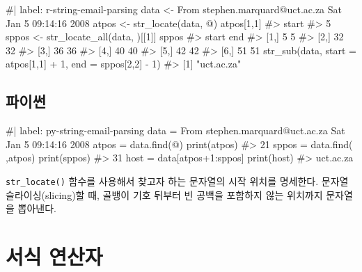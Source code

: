 \documentclass[
  letterpaper,
]{book}
\newenvironment{Shaded}{\begin{snugshade}}{\end{snugshade}}
\newcommand{\NormalTok}[1]{\textcolor[rgb]{0.00,0.23,0.31}{#1}}
\begin{document}
\begin{Shaded}
\begin{Highlighting}[]
\NormalTok{\#| label: r{-}string{-}email{-}parsing}
\NormalTok{data \textless{}{-} \textquotesingle{}From stephen.marquard@uct.ac.za Sat Jan 5 09:14:16 2008\textquotesingle{}}
\NormalTok{atpos \textless{}{-} str\_locate(data, \textquotesingle{}@\textquotesingle{})}
\NormalTok{atpos[1,1]}
\NormalTok{\#\textgreater{} start }
\NormalTok{\#\textgreater{}    5 }
\NormalTok{sppos \textless{}{-} str\_locate\_all(data, \textquotesingle{} \textquotesingle{})[[1]]}
\NormalTok{sppos}
\NormalTok{\#\textgreater{}      start end}
\NormalTok{\#\textgreater{} [1,]     5   5}
\NormalTok{\#\textgreater{} [2,]    32  32}
\NormalTok{\#\textgreater{} [3,]    36  36}
\NormalTok{\#\textgreater{} [4,]    40  40}
\NormalTok{\#\textgreater{} [5,]    42  42}
\NormalTok{\#\textgreater{} [6,]    51  51}
\NormalTok{str\_sub(data, start = atpos[1,1] + 1, end = sppos[2,2] {-} 1)}
\NormalTok{\#\textgreater{} [1] "uct.ac.za"}
\end{Highlighting}
\end{Shaded}

\subsection{파이썬}

\begin{Shaded}
\begin{Highlighting}[]
\NormalTok{\#| label: py{-}string{-}email{-}parsing}
\NormalTok{data = \textquotesingle{}From stephen.marquard@uct.ac.za Sat Jan 5 09:14:16 2008\textquotesingle{}}
\NormalTok{atpos = data.find(\textquotesingle{}@\textquotesingle{})}
\NormalTok{print(atpos)}
\NormalTok{\#\textgreater{} 21}
\NormalTok{sppos = data.find(\textquotesingle{} \textquotesingle{},atpos)}
\NormalTok{print(sppos)}
\NormalTok{\#\textgreater{} 31}
\NormalTok{host = data[atpos+1:sppos]}
\NormalTok{print(host)}
\NormalTok{\#\textgreater{} uct.ac.za}
\end{Highlighting}
\end{Shaded}

\texttt{str\_locate()} 함수를 사용해서 찾고자 하는 문자열의 시작 위치를
명세한다. 문자열 슬라이싱(slicing)할 때, 골뱅이 기호 뒤부터 빈 공백을
포함하지 않는 위치까지 문자열을 뽑아낸다.

\section{서식 연산자}\label{r-string-format}
\end{document}
